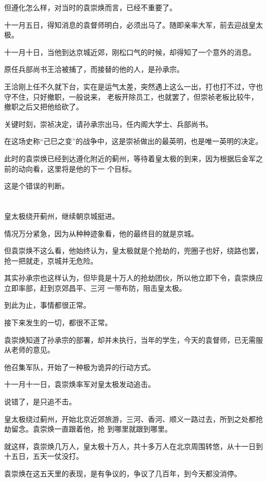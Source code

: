 \documentclass[11pt,a4paper,onecolumn]{article}
\begin{document}
但遵化怎么样，对当时的袁崇焕而言，已经不重要了。

十一月五日，得知消息的袁督师明白，必须出马了。随即亲率大军，前去迎战皇太极。

十一月十日，当他到达京城近郊，刚松口气的时候，却得知了一个意外的消息。

原任兵部尚书王洽被捕了，而接替的他的人，是孙承宗。

王洽刚上任不久就下台，实在是运气太差，突然遇上这么一出，打也打不过，守也守不住，只好撤职，一般说来，
老板开除员工，也就罢了，但崇祯老板比较牛，撤职之后又把他给砍了。

关键时刻，崇祯决定，请孙承宗出马，任内阁大学士、兵部尚书。

在这场史称``己巳之变''的战争中，这是崇祯做出的最英明，也是唯一英明的决定。

此时的袁崇焕已经到达遵化附近的蓟州，等待着皇太极的到来，因为根据后金军之前的动向看，这里将是他的下一
个目标。

这是个错误的判断。

\section[\thesection]{}

皇太极绕开蓟州，继续朝京城挺进。

情况万分紧急，因为从种种迹象看，他的最终目的就是京城。

但袁崇焕不这么看，他始终认为，皇太极就是个抢劫的，兜圈子也好，绕路也罢，抢一把就走，京城并无危险。

其实孙承宗也这样认为，但毕竟是十万人的抢劫团伙，所以他立即下令，袁崇焕应立即率部，赶到京郊昌平、三河
一带布防，阻击皇太极。

到此为止，事情都很正常。

接下来发生的一切，都很不正常。

袁崇焕知道了孙承宗的部署，却并未执行，当年的学生，今天的袁督师，已无需服从老师的意见。

他召集军队，开始了一种极为诡异的行动方式。

十一月十一日，袁崇焕率军对皇太极发动追击。

说错了，是只追不击。

皇太极绕过蓟州，开始北京近郊旅游，三河、香河、顺义一路过去，所到之处都抢劫留念。袁崇焕一直跟着他，抢
到哪里就跟到哪里。

就这样，袁崇焕几万人，皇太极十万人，共十多万人在北京周围转悠，从十一日到十五日，五天一仗没打。

袁崇焕在这五天里的表现，是有争议的，争议了几百年，到今天都没消停。
\end{document}
